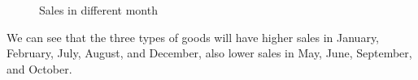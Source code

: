 \documentclass[12pt]{mcmthesis}
\begin{document}
\begin{figure}[htbp]
	\centering
	
	\quad
	
	\quad
	
	\caption{Sales in different month}
\end{figure}
\newpage
We can see that the three types of goods will have higher sales in January, February, July, August, and December, also lower sales in May, June, September, and October.
\end{document}
